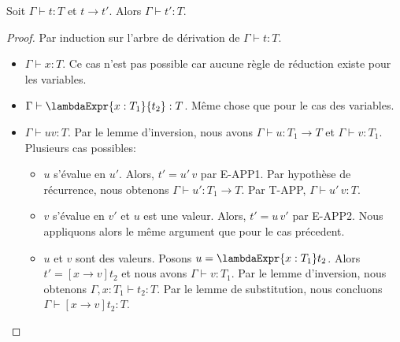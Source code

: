 \begin{theorem} 
  \label{thm:simply-typed-lambda-calculus-preservation}
  Soit $\Gamma \vdash t : T$ et $t \rightarrow t'$. Alors $\Gamma \vdash t' :
  T$.
\end{theorem}

\begin{proof}
  \label{proof:simply-typed-lambda-calculus-preservation}
  Par induction sur l'arbre de dérivation de $\Gamma \vdash t : T$.
  \begin{itemize}
  \item $\Gamma \vdash x : T$. Ce cas n'est pas possible car aucune règle de
    réduction existe pour les variables.
  \item $\Gamma \vdash \lambdaExpr{x : T_{1}}{t_{2}} : T$. Même chose que pour le
    cas des variables.
  \item $\Gamma \vdash u v : T$. Par le lemme d'inversion, nous avons $\Gamma
    \vdash u : T_{1} \rightarrow T$ et $\Gamma \vdash v : T_{1}$. Plusieurs cas possibles:
    \begin{itemize}
    \item $u$ s'évalue en $u'$. Alors, $t' = u' \, v$ par E-APP1. Par hypothèse
      de récurrence, nous
      obtenons $\Gamma \vdash u' : T_{1} \rightarrow T$. Par T-APP,
      $\Gamma \vdash u' \, v : T$.
    \item $v$ s'évalue en $v'$ et $u$ est une valeur. Alors, $t' = u \, v'$ par
      E-APP2. Nous appliquons alors le même argument que pour le cas précedent.
    \item $u$ et $v$ sont des valeurs. Posons $u = \lambdaExpr{x : T_{1}} t_{2}$.
      Alors $t' = [x \rightarrow v]t_{2}$ et nous avons $\Gamma \vdash v :
      T_{1}$. Par le lemme d'inversion, nous obtenons $\Gamma, x : T_{1} \vdash t_{2}
      : T$. Par le lemme de
      substitution, nous concluons $\Gamma \vdash [x \rightarrow v]t_{2} : T$.
    \end{itemize}
  \end{itemize}
\end{proof}